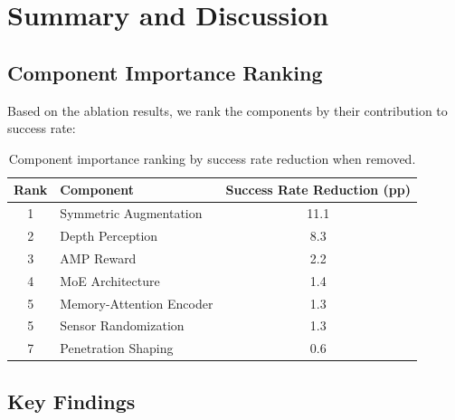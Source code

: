 \section{Summary and Discussion}
\label{sec:ablation_summary}

\subsection{Component Importance Ranking}

Based on the ablation results, we rank the components by their contribution to success rate:

\begin{table}[t]
\centering
\caption{Component importance ranking by success rate reduction when removed.}
\label{tab:importance_ranking}
\begin{tabular}{clc}
\toprule
\textbf{Rank} & \textbf{Component} & \textbf{Success Rate Reduction (pp)} \\
\midrule
1 & Symmetric Augmentation & 11.1 \\
2 & Depth Perception & 8.3 \\
3 & AMP Reward & 2.2 \\
4 & MoE Architecture & 1.4 \\
5 & Memory-Attention Encoder & 1.3 \\
5 & Sensor Randomization & 1.3 \\
7 & Penetration Shaping & 0.6 \\
\bottomrule
\end{tabular}
\end{table}

\subsection{Key Findings}

